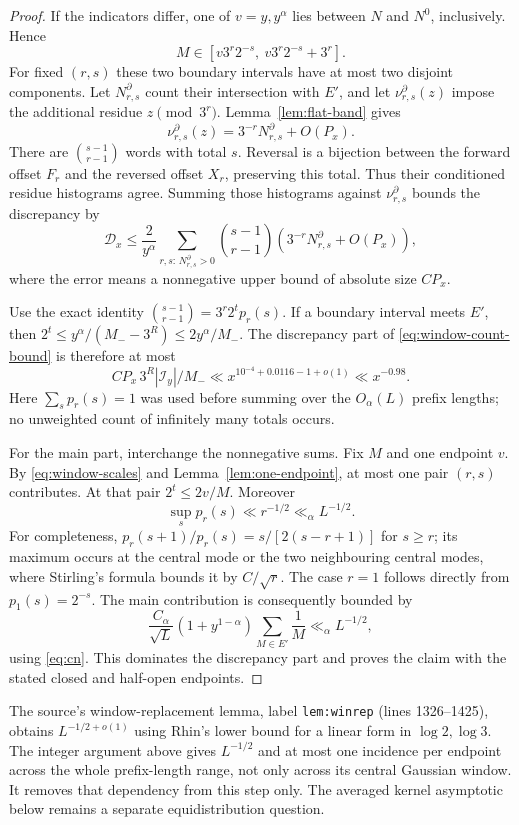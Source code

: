 \documentclass[11pt]{article}
\theoremstyle{remark}\newtheorem{remark}[proposition]{Remark}
\begin{document}
\begin{proof}
If the indicators differ, one of $v=y,y^\alpha$ lies between $N$ and
$N^0$, inclusively. Hence
\[
 M\in[v3^r2^{-s},\ v3^r2^{-s}+3^r].
\]
For fixed $(r,s)$ these two boundary intervals have at most two disjoint
components. Let $N^\partial_{r,s}$ count their intersection with $E'$,
and let $\nu^\partial_{r,s}(z)$ impose the additional residue $z\pmod{3^r}$.
Lemma~\ref{lem:flat-band} gives
\[
 \nu^\partial_{r,s}(z)=3^{-r}N^\partial_{r,s}+O(P_x).
\]
There are $\binom{s-1}{r-1}$ words with total $s$. Reversal is a bijection
between the forward offset $F_r$ and the reversed offset $X_r$, preserving
this total. Thus their conditioned residue histograms agree. Summing those
histograms against $\nu^\partial_{r,s}$ bounds the discrepancy by
\begin{equation}\label{eq:window-count-bound}
 \mathcal D_x\le\frac{2}{y^\alpha}
 \sum_{r,s:\,N^\partial_{r,s}>0}
 \binom{s-1}{r-1}\left(3^{-r}N^\partial_{r,s}+O(P_x)\right),
\end{equation}
where the error means a nonnegative upper bound of absolute size $CP_x$.

Use the exact identity
$\binom{s-1}{r-1}=3^r2^t p_r(s)$. If a boundary interval meets $E'$,
then $2^t\le y^\alpha/(M_--3^R)\le2y^\alpha/M_-$.
The discrepancy part of \eqref{eq:window-count-bound} is therefore at most
\[
 C P_x\,3^R|\mathcal I_y|/M_-
 \ll x^{10^{-4}+0.0116-1+o(1)}\ll x^{-0.98}.
\]
Here $\sum_s p_r(s)=1$ was used before summing over the $O_\alpha(L)$
prefix lengths; no unweighted count of infinitely many totals occurs.

For the main part, interchange the nonnegative sums. Fix $M$ and one
endpoint $v$. By \eqref{eq:window-scales} and
Lemma~\ref{lem:one-endpoint}, at most one pair $(r,s)$ contributes.
At that pair $2^t\le2v/M$. Moreover
\[
 \sup_s p_r(s)\ll r^{-1/2}\ll_\alpha L^{-1/2}.
\]
For completeness, $p_r(s+1)/p_r(s)=s/[2(s-r+1)]$ for $s\ge r$;
its maximum occurs at the central mode or the two neighbouring central
modes, where Stirling's formula bounds it by $C/\sqrt r$. The case
$r=1$ follows directly from $p_1(s)=2^{-s}$.
The main contribution is consequently bounded by
\[
 \frac{C_\alpha}{\sqrt L}
       (1+y^{1-\alpha})\sum_{M\in E'}\frac1M
 \ll_\alpha L^{-1/2},
\]
using \eqref{eq:cn}. This dominates the discrepancy part and proves the
claim with the stated closed and half-open endpoints.
\end{proof}

The source's window-replacement lemma, label \texttt{lem:winrep}
(lines 1326--1425), obtains $L^{-1/2+o(1)}$ using Rhin's lower bound
for a linear form in $\log2,\log3$. The integer argument above gives
$L^{-1/2}$ and at most one incidence per endpoint across the whole
prefix-length range, not only across its central Gaussian window.
It removes that dependency from this step only. The averaged kernel
asymptotic below remains a separate equidistribution question.
\end{document}
